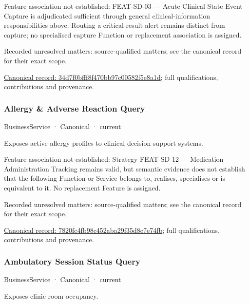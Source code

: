 Feature association not established: FEAT-SD-03 — Acute Clinical State Event Capture is adjudicated sufficient through general clinical-information responsibilities above. Routing a critical-result alert remains distinct from capture; no specialised capture Function or replacement association is assigned.


{\small Recorded unresolved matters: source-qualified matters; see the canonical record for their exact scope.}\par
{\footnotesize \href{../../../../continuum/business/business-service/34d7f0bfff8f470bb97c00582f5e8a1d.md}{Canonical record: 34d7f0bfff8f470bb97c00582f5e8a1d}; full qualifications, contributions and provenance.}\par
\subsubsection{Allergy \& Adverse Reaction Query}

\label{element:7820fc4fb98c452aba29f35d8c7e74fb}
{\small BusinessService · Canonical · current}\par

Exposes active allergy profiles to clinical decision support systems.



Feature association not established: Strategy FEAT-SD-12 — Medication Administration Tracking remains valid, but semantic evidence does not establish that the following Function or Service belongs to, realises, specialises or is equivalent to it. No replacement Feature is assigned.


{\small Recorded unresolved matters: source-qualified matters; see the canonical record for their exact scope.}\par
{\footnotesize \href{../../../../continuum/business/business-service/7820fc4fb98c452aba29f35d8c7e74fb.md}{Canonical record: 7820fc4fb98c452aba29f35d8c7e74fb}; full qualifications, contributions and provenance.}\par
\subsubsection{Ambulatory Session Status Query}

\label{element:a790a785f2e148d7a1c99655d53db4e9}
{\small BusinessService · Canonical · current}\par

Exposes clinic room occupancy.



